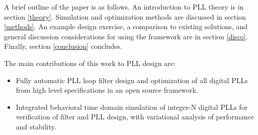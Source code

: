A brief outline of the paper is as follows. An introduction to PLL theory is in section \ref{theory}. Simulation and optimization methods are discussed in section \ref{methods}. An example design exercise, a comparison to existing solutions, and general discussion considerations for using the framework are in section \ref{disco}. Finally, section \ref{conclusion} concludes.
\vspace{1em}

The main contributions of this work to PLL design are:
\vspace{-0.8em}
\begin{itemize}
	\setlength\itemsep{-0.8em}
	\item Fully automatic PLL loop filter design and optimization of all digital PLLs from high level specifications in an open source framework.
	\item Integrated behavioral time domain simulation of integer-N digital PLLs for verification of filter and PLL design, with variational analysis of performance and stability.
\end{itemize}

